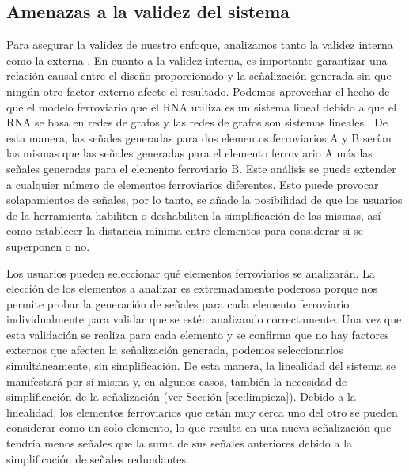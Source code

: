 \subsection{Amenazas a la validez del sistema}
    \label{sec:validacion}
    Para asegurar la validez de nuestro enfoque, analizamos tanto la validez interna como la externa \cite{Paper_139,Paper_121,Paper_185}. En cuanto a la validez interna, es importante garantizar una relación causal entre el diseño proporcionado y la señalización generada sin que ningún otro factor externo afecte el resultado. Podemos aprovechar el hecho de que el modelo ferroviario que el RNA utiliza es un sistema lineal debido a que el RNA se basa en redes de grafos \cite{Paper_109,Paper_112,Paper_149,Paper_150,Paper_201} y las redes de grafos son sistemas lineales \cite{Paper_19,Paper_86,Paper_89,Paper_101,Paper_102,Paper_114,Paper_115,Paper_141,Paper_142,Paper_144,Paper_146,Paper_151,Paper_154,Paper_155,Paper_162,Paper_163,Paper_169,Paper_171,Paper_180}. De esta manera, las señales generadas para dos elementos ferroviarios A y B serían las mismas que las señales generadas para el elemento ferroviario A más las señales generadas para el elemento ferroviario B. Este análisis se puede extender a cualquier número de elementos ferroviarios diferentes. Esto puede provocar solapamientos de señales, por lo tanto, se añade la posibilidad de que los usuarios de la herramienta habiliten o deshabiliten la simplificación de las mismas, así como establecer la distancia mínima entre elementos para considerar si se superponen o no.

    Los usuarios pueden seleccionar qué elementos ferroviarios se analizarán. La elección de los elementos a analizar es extremadamente poderosa porque nos permite probar la generación de señales para cada elemento ferroviario individualmente para validar que se estén analizando correctamente. Una vez que esta validación se realiza para cada elemento y se confirma que no hay factores externos que afecten la señalización generada, podemos seleccionarlos simultáneamente, sin simplificación. De esta manera, la linealidad del sistema se manifestará por sí misma y, en algunos casos, también la necesidad de simplificación de la señalización (ver Sección \ref{sec:limpieza}). Debido a la linealidad, los elementos ferroviarios que están muy cerca uno del otro se pueden considerar como un solo elemento, lo que resulta en una nueva señalización que tendría menos señales que la suma de sus señales anteriores debido a la simplificación de señales redundantes.

